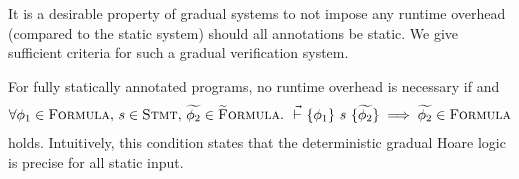 It is a desirable property of gradual systems to not impose any runtime overhead (compared to the static system) should all annotations be static.
We give sufficient criteria for such a gradual verification system.
\begin{lemma}
    \label{lemma:oh-free}
    For fully statically annotated programs, no runtime overhead is necessary if  and
    \begin{align}
    \label{lemma-frm:oh-free}
    \forall \phi_1 \in \textup{\textsc{Formula}},\, s \in \textup{\textsc{Stmt}},\, \widetilde{\phi_2} \in \textup{\textsc{\ensuremath{\widetilde{\text{F}}}ormula}}.~ {} \,\,\vec{\vdash}\,\, \{{\phi_1}\} ~{s}~ \{{\widetilde{\phi_2}}\} \implies \widetilde{\phi_2} \in \textup{\textsc{Formula}}
    \end{align}
    holds.
    Intuitively, this condition states that the deterministic gradual Hoare logic is precise for all static input.
    
\end{lemma}
